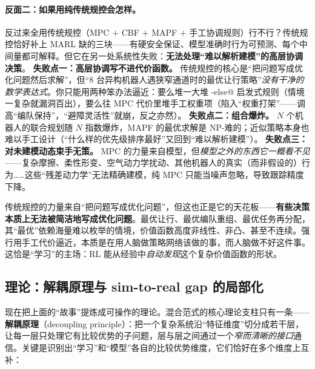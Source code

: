 \paragraph{反面二：如果用纯传统规控会怎样。}
反过来全用传统规控（MPC $+$ CBF $+$ MAPF $+$ 手工协调规则）行不行？传统规控恰好补上 MARL 缺的三块——有硬安全保证、模型准确时行为可预测、每个中间量都可解释。但它在另一处系统性失败：\textbf{无法处理“难以解析建模”的高层协调决策}。
\textbf{失败点一：高层协调写不进代价函数。} 传统规控的核心是“把问题写成优化问题然后求解”，但“$8$ 台异构机器人遇狭窄通道时的最优让行策略”\emph{没有干净的数学表达式}。你只能用两种笨办法逼近：要么堆一大堆 \verb@if-else@ 启发式规则（情境一复杂就漏洞百出），要么往 MPC 代价里堆手工权重项（陷入“权重打架”——调高“编队保持”，“避障灵活性”就崩，反之亦然）。
\textbf{失败点二：组合爆炸。} $N$ 个机器人的联合规划随 $N$ 指数爆炸，MAPF 的最优求解是 NP-难的；近似策略本身也难以手工设计（“什么样的优先级排序最好”又回到“难以解析建模”）。
\textbf{失败点三：对未建模动态束手无策。} MPC 的力量来自模型，但\emph{模型之外的东西它一概看不见}——复杂摩擦、柔性形变、空气动力学扰动、其他机器人的真实（而非假设的）行为……这些“残差动力学”无法精确建模，纯 MPC 只能当噪声忽略，导致跟踪精度下降。

\begin{insight}
传统规控的力量来自“把问题写成优化问题”，但这也正是它的天花板——\textbf{有些决策本质上无法被简洁地写成优化问题}。最优让行、最优编队重组、最优任务再分配，其“最优”依赖海量难以枚举的情境，价值函数高度非线性、非凸、甚至不连续。强行用手工代价逼近，本质是在用人脑做策略网络该做的事，而人脑做不好这件事。这恰是“学习”的主场：RL 能从经验中\emph{自动发现}这个复杂价值函数的形状。
\end{insight}

\subsection{理论：解耦原理与 sim-to-real gap 的局部化}
\label{sec:mh-decoupling}

现在把上面的“故事”提炼成可操作的理论。混合范式的核心理论支柱只有一条——\textbf{解耦原理}（decoupling principle）：把一个复杂系统沿“特征维度”切分成若干层，让每一层只处理它有比较优势的子问题，层与层之间通过一个\emph{窄而清晰的接口}通信。关键是识别出“学习”和“模型”各自的比较优势维度，它们恰好在多个维度上互补：

